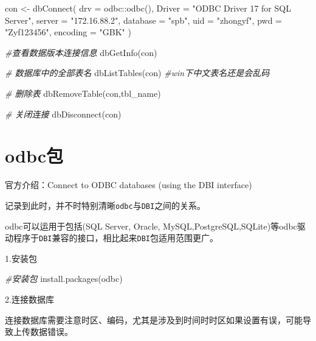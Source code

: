 \documentclass[
]{book}
\newenvironment{Shaded}{\begin{snugshade}}{\end{snugshade}}
\newcommand{\AttributeTok}[1]{\textcolor[rgb]{0.77,0.63,0.00}{#1}}
\newcommand{\CommentTok}[1]{\textcolor[rgb]{0.56,0.35,0.01}{\textit{#1}}}
\newcommand{\FunctionTok}[1]{\textcolor[rgb]{0.00,0.00,0.00}{#1}}
\newcommand{\NormalTok}[1]{#1}
\newcommand{\OtherTok}[1]{\textcolor[rgb]{0.56,0.35,0.01}{#1}}
\newcommand{\SpecialCharTok}[1]{\textcolor[rgb]{0.00,0.00,0.00}{#1}}
\newcommand{\StringTok}[1]{\textcolor[rgb]{0.31,0.60,0.02}{#1}}
\begin{document}
\begin{Shaded}
\begin{Highlighting}[]
\NormalTok{con }\OtherTok{\textless{}{-}} \FunctionTok{dbConnect}\NormalTok{(}
  \AttributeTok{drv =}\NormalTok{ odbc}\SpecialCharTok{::}\FunctionTok{odbc}\NormalTok{(),}
  \AttributeTok{Driver =} \StringTok{"ODBC Driver 17 for SQL Server"}\NormalTok{, }\AttributeTok{server =} \StringTok{"172.16.88.2"}\NormalTok{, }
  \AttributeTok{database =} \StringTok{"spb"}\NormalTok{, }\AttributeTok{uid =} \StringTok{"zhongyf"}\NormalTok{, }\AttributeTok{pwd =} \StringTok{"Zyf123456"}\NormalTok{, }\AttributeTok{encoding =} \StringTok{"GBK"}
\NormalTok{)}

\CommentTok{\#查看数据版本连接信息}
\FunctionTok{dbGetInfo}\NormalTok{(con)}

\CommentTok{\# 数据库中的全部表名}
\FunctionTok{dbListTables}\NormalTok{(con) }\CommentTok{\#win下中文表名还是会乱码}

\CommentTok{\# 删除表}
\FunctionTok{dbRemoveTable}\NormalTok{(con,}\StringTok{\textquotesingle{}tbl\_name\textquotesingle{}}\NormalTok{)}

\CommentTok{\# 关闭连接}
\FunctionTok{dbDisconnect}\NormalTok{(con)}
\end{Highlighting}
\end{Shaded}

\hypertarget{odbcux5305}{%
\section{odbc包}\label{odbcux5305}}

官方介绍：Connect to ODBC databases (using the DBI interface)

记录到此时，并不时特别清晰\texttt{odbc}与\texttt{DBI}之间的关系。

odbc可以运用于包括(SQL Server, Oracle, MySQL,PostgreSQL,SQLite)等odbc驱动程序于\texttt{DBI}兼容的接口，相比起来\texttt{DBI}包适用范围更广。

1.安装包

\begin{Shaded}
\begin{Highlighting}[]
\CommentTok{\#安装包}
\FunctionTok{install.packages}\NormalTok{(}\StringTok{\textquotesingle{}odbc\textquotesingle{}}\NormalTok{)}
\end{Highlighting}
\end{Shaded}

2.连接数据库

连接数据库需要注意时区、编码，尤其是涉及到时间时时区如果设置有误，可能导致上传数据错误。
\end{document}
